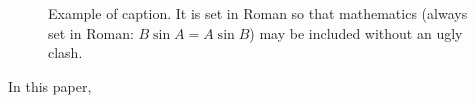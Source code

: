 \begin{figure}[t]
\begin{center}
\fbox{\rule{0pt}{2in} \rule{0.9\linewidth}{0pt}}
\end{center}
   \caption{Example of caption.  It is set in Roman so that mathematics
   (always set in Roman: $B \sin A = A \sin B$) may be included without an
   ugly clash.}
\label{fig:noisylabel}
\end{figure}

In this paper, 